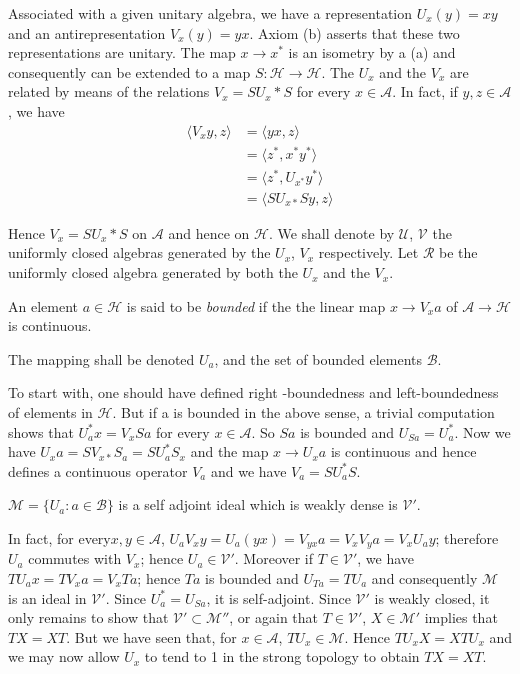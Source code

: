 Associated with a given unitary algebra, we have a representation\break
$U_x(y)= xy$ and an antirepresentation $V_x(y)=yx$. Axiom (b)
asserts that these two representations are unitary. The map
$x\longrightarrow x^*$ is an isometry  by a (a) and consequently can
be extended to a map $S:\mathscr{H}\rightarrow\mathscr{H}$. The $U_x$
and the $V_x$ are related by means of the relations $V_x=SU_x * S$ for
every $x\in\mathcal{A}$. In fact, if $y,z\in \mathcal{A}$,  we have  
\begin{align*}
\langle V_x y,z \rangle &= \langle yx,z \rangle \\
&= \langle z^*, x^* y^* \rangle\\
&= \langle z^*, U_{x^*}y^*\rangle\\
&= \langle SU_{x*}Sy,z \rangle
\end{align*}

Hence $V_x=SU_x*S$ on $\mathcal{A}$ and hence on $\mathscr{H}$. We
shall denote by $\mathcal{U}$, $\mathcal{V}$ the uniformly closed
algebras generated by  the $U_x$, $V_x$ respectively. Let
$\mathcal{R}$ be the uniformly closed algebra generated by both the
$U_x$ and the $V_x$. 

\begin{defi*}%
 An element $a \in\mathscr{H}$  is said to be {\em bounded} if the
 the linear map $x \rightarrow V_x a$ of
 $\mathcal{A}\rightarrow\mathscr{H}$ is continuous. 
 \end{defi*}
 
 The mapping shall be denoted $U_a$, and the set of bounded elements
 $\mathscr{B}$. 
 
 \begin{remark*}%
 To start with, one should have defined right -boundedness and
 left-boundedness of elements in $\mathscr{H}$. But if a is bounded in
 the above sense, a trivial computation shows that $U^*_a x = V_xSa$ for
 every $x\in\mathcal{A}$. So $Sa$ is bounded and $U_{Sa}=U_a^*$. Now we
 have $U_x a=SV_{x*}S_a=SU^*_a S_x$ and the map $x\rightarrow U_x a$
 is continuous and hence defines a continuous operator $V_a$ and we
 have $V_a=SU^*_aS$. 
\end{remark*}

\setcounter{proposition}{0}
\begin{proposition}\label{partIII-chap3-prop1}%
 $\mathscr{M}=\{U_a:a\in \mathscr{B}\}$\pageoriginale 
is a self adjoint ideal which is weakly
  dense is $\mathcal{V}'$. 
\end{proposition}

In fact, for every$ x,y\in \mathcal{A}$, $U_a V_x y=U_a(yx)=V_{yx}a= V_x
V_ya= V_xU_ay$; therefore $U_a$ commutes with $V_x$; hence $U_a\in
\mathcal{V}'$. Moreover if $T\in \mathcal{V}'$, we have $TU_a x =
TV_xa=V_xTa$; hence $Ta$ is bounded and $U_{Ta}=TU_a$ and consequently
$\mathscr{M}$ is an ideal in $\mathcal{V}'$. Since $U_a^*=U_{Sa}$, it is
self-adjoint. Since $\mathcal{V}'$ is weakly closed, it only remains to
show that $\mathcal{V}' \subset \mathscr{M}''$, or again that $T \in
\mathcal{V}'$, $X \in \mathscr{M}'$ implies that $TX=XT$. But we have
seen that, for $x\in 
\mathcal{A}$, $TU_x \in \mathscr{M}$. Hence $TU_x X=XTU_x$ and we may now allow
$U_x$ to tend to 1 in the strong topology to obtain $TX=XT$. 
 
